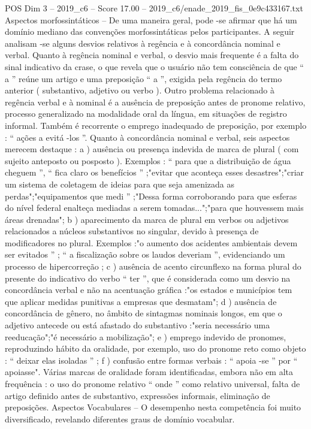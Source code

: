 \begin{textsample}{POS Dim 3 – 2019\_c6 – Score 17.00 – 2019\_c6/enade\_2019\_fis\_0e9c433167.txt}
Aspectos morfossintáticos – De uma maneira geral, pode -se afirmar que há um domínio mediano das convenções morfossintáticas pelos participantes.
A seguir analisam -se alguns desvios relativos à regência e à concordância nominal e verbal.
Quanto à regência nominal e verbal, o desvio mais frequente é a falta do sinal indicativo da crase, o que revela que o usuário não tem consciência de que “ a ” reúne um artigo e uma preposição “ a ”, exigida pela regência do termo anterior ( substantivo, adjetivo ou verbo ).
Outro problema relacionado à regência verbal e à nominal é a ausência de preposição antes de pronome relativo, processo generalizado na modalidade oral da língua, em situações de registro informal.
Também é recorrente o emprego inadequado de preposição, por exemplo : “ ações a evitá -los ”.
Quanto à concordância nominal e verbal, seis aspectos merecem destaque : a ) ausência ou presença indevida de marca de plural ( com sujeito anteposto ou posposto ).
Exemplos : “ para que a distribuição de água cheguem ”, “ fica claro os benefícios ” ;"evitar que aconteça esses desastres";"criar um sistema de coletagem de ideias para que seja amenizada as perdas";"equipamentos que medi ” ;"Dessa forma corroborando para que esferas do nível federal enalteça mediadas a serem tomadas...";"para que houvessem mais áreas drenadas"; b ) aparecimento da marca de plural em verbos ou adjetivos relacionados a núcleos substantivos no singular, devido à presença de modificadores no plural.
Exemplos :"o aumento dos acidentes ambientais devem ser evitados ” ; “ a fiscalização sobre os laudos deveriam ”, evidenciando um processo de hipercorreção ; c ) ausência de acento circunflexo na forma plural do presente do indicativo do verbo “ ter ”, que é considerada como um desvio na concordância verbal e não na acentuação gráfica :"os estados e municípios tem que aplicar medidas punitivas a empresas que desmatam"; d ) ausência de concordância de gênero, no âmbito de sintagmas nominais longos, em que o adjetivo antecede ou está afastado do substantivo :"seria necessário uma reeducação";"é necessário a mobilização"; e ) emprego indevido de pronomes, reproduzindo hábito da oralidade, por exemplo, uso do pronome reto como objeto : “ deixar elas isoladas ” ; f ) confusão entre formas verbais : “ apoia -se ” por “ apoiasse".
Várias marcas de oralidade foram identificadas, embora não em alta frequência : o uso do pronome relativo “ onde ” como relativo universal, falta de artigo definido antes de substantivo, expressões informais, eliminação de preposições.
Aspectos Vocabulares – O desempenho nesta competência foi muito diversificado, revelando diferentes graus de domínio vocabular.

\end{textsample}
